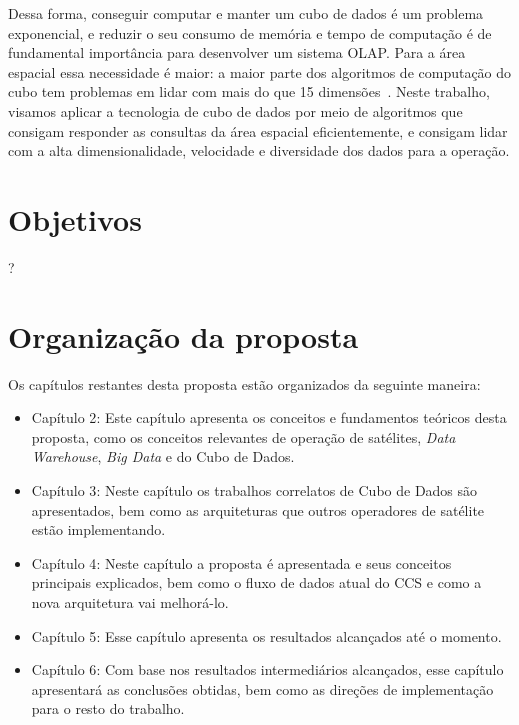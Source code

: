 Dessa forma, conseguir computar e manter um cubo de dados é um problema exponencial, e reduzir o seu consumo de memória e tempo de computação é de fundamental importância para desenvolver um sistema OLAP.
Para a área espacial essa necessidade é maior: a maior parte dos algoritmos de computação do cubo tem problemas em lidar com mais do que 15 dimensões~\cite{silva:2015:abordagensParaCubo}.
Neste trabalho, visamos aplicar a tecnologia de cubo de dados por meio de algoritmos que consigam responder as consultas da área espacial eficientemente, e consigam lidar com a alta dimensionalidade, velocidade e diversidade dos dados para a operação.

\section{Objetivos}\label{ch:intro:obj}

{\color{red} ?}

\section{Organização da proposta}\label{ch:intro:org}

Os capítulos restantes desta proposta estão organizados da seguinte maneira:

\begin{itemize}
	\item{Capítulo 2}: Este capítulo apresenta os conceitos e fundamentos teóricos desta proposta, como os conceitos relevantes de operação de satélites, \textit{Data Warehouse}, \textit{Big Data} e do Cubo de Dados.
	\item{Capítulo 3}: Neste capítulo os trabalhos correlatos de Cubo de Dados são apresentados, bem como as arquiteturas que outros operadores de satélite estão implementando.
	\item{Capítulo 4}: {\color{red} Neste capítulo a proposta é apresentada e seus conceitos principais explicados, bem como o fluxo de dados atual do CCS e como a nova arquitetura vai melhorá-lo.}
	\item{Capítulo 5}: Esse capítulo apresenta os resultados alcançados até o momento.
	\item{Capítulo 6}: Com base nos resultados intermediários alcançados, esse capítulo apresentará as conclusões obtidas, bem como as direções de implementação para o resto do trabalho.
\end{itemize}

